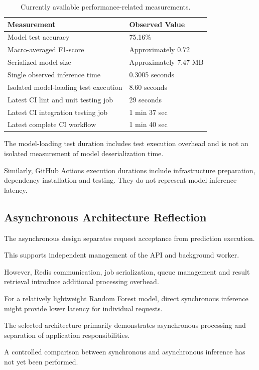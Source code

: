 \documentclass[11pt,a4paper]{article}
\begin{document}
\begin{table}[H]
\centering
\begin{tabularx}{\linewidth}{@{}Xl@{}}
\toprule
\textbf{Measurement} & \textbf{Observed Value}\\
\midrule
Model test accuracy & 75.16\%\\
Macro-averaged F1-score & Approximately 0.72\\
Serialized model size & Approximately 7.47 MB\\
Single observed inference time & 0.3005 seconds\\
Isolated model-loading test execution & 8.60 seconds\\
Latest CI lint and unit testing job & 29 seconds\\
Latest CI integration testing job & 1 min 37 sec\\
Latest complete CI workflow & 1 min 40 sec\\
\bottomrule
\end{tabularx}
\caption{Currently available performance-related measurements.}
\end{table}

The model-loading test duration includes test
execution overhead and is not an isolated
measurement of model deserialization time.

Similarly, GitHub Actions execution durations
include infrastructure preparation, dependency
installation and testing. They do not represent
model inference latency.

\subsection{Asynchronous Architecture Reflection}

The asynchronous design separates request
acceptance from prediction execution.

This supports independent management of the
API and background worker.

However, Redis communication, job serialization,
queue management and result retrieval introduce
additional processing overhead.

For a relatively lightweight Random Forest model,
direct synchronous inference might provide lower
latency for individual requests.

The selected architecture primarily demonstrates
asynchronous processing and separation of
application responsibilities.

A controlled comparison between synchronous and
asynchronous inference has not yet been performed.
\end{document}
